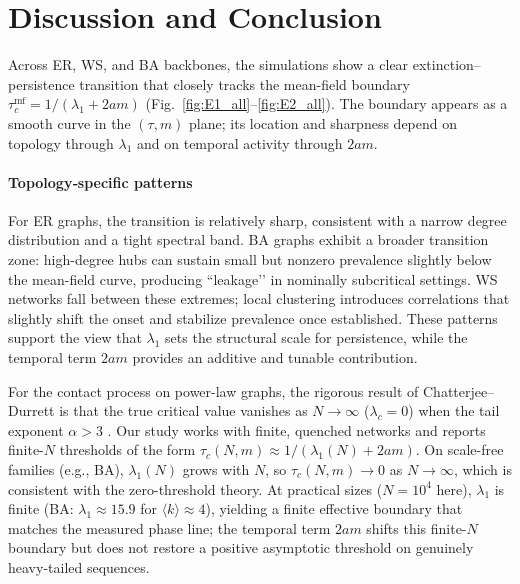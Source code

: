 \documentclass[pdflatex,sn-mathphys-num]{sn-jnl}%
\theoremstyle{thmstyleone}%
\theoremstyle{thmstyletwo}%
\theoremstyle{thmstylethree}%
\begin{document}

\section{Discussion and Conclusion}

Across ER, WS, and BA backbones, the simulations show a clear extinction–persistence
transition that closely tracks the mean-field boundary
\(\tau_c^{\text{mf}}=1/(\lambda_1+2am)\) (Fig.~\ref{fig:E1_all}–\ref{fig:E2_all}).
The boundary appears as a smooth curve in the \((\tau,m)\) plane; its location and sharpness
depend on topology through \(\lambda_1\) and on temporal activity through \(2am\).

\paragraph*{Topology‐specific patterns}
For ER graphs, the transition is relatively sharp, consistent with a narrow degree
distribution and a tight spectral band. BA graphs exhibit a broader transition zone:
high-degree hubs can sustain small but nonzero prevalence slightly below the
mean-field curve, producing ``leakage’’ in nominally subcritical settings.
WS networks fall between these extremes; local clustering introduces correlations that
slightly shift the onset and stabilize prevalence once established. These patterns
support the view that \(\lambda_1\) sets the structural scale for persistence, while
the temporal term \(2am\) provides an additive and tunable contribution.

For the contact process on power-law graphs, the rigorous result of
Chatterjee–Durrett is that the true critical value vanishes as \(N\to\infty\)
(\(\lambda_c=0\)) when the tail exponent \(\alpha>3\) \cite{ChatterjeeDurrett2009}.
Our study works with finite, quenched networks and reports finite-\(N\) thresholds
of the form \(\tau_c(N,m)\approx 1/(\lambda_1(N)+2am)\).
On scale-free families (e.g., BA), \(\lambda_1(N)\) grows with \(N\), so
\(\tau_c(N,m)\to 0\) as \(N\to\infty\), which is consistent with the zero-threshold
theory. At practical sizes (\(N=10^4\) here), \(\lambda_1\) is finite
(BA: \(\lambda_1\!\approx\!15.9\) for \(\langle k\rangle\!\approx\!4\)),
yielding a finite effective boundary that matches the measured phase line; the
temporal term \(2am\) shifts this finite-\(N\) boundary but does not restore a positive
asymptotic threshold on genuinely heavy-tailed sequences.
\end{document}
